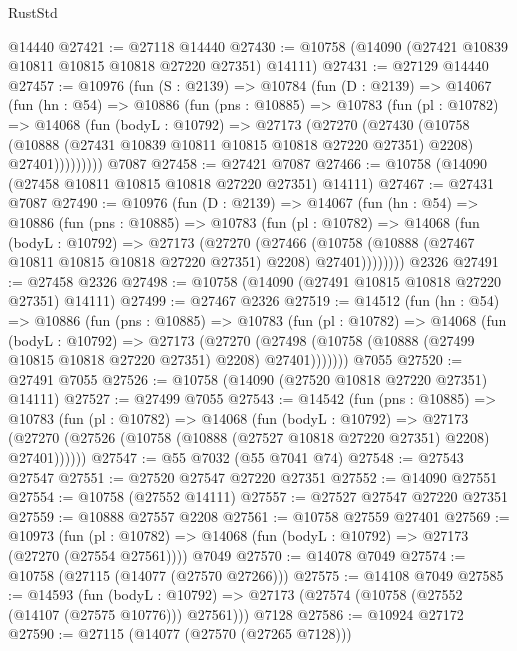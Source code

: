 \begin{lexlean}{RustStd}
\begin{coremodule}
    @14440
@27421 := @27118 @14440
@27430 := @10758 (@14090 (@27421 @10839 @10811 @10815 @10818 @27220 @27351) @14111)
@27431 := @27129 @14440
@27457 := @10976
    (fun (S : @2139) =>
    @10784
      (fun (D : @2139) =>
      @14067
        (fun (hn : @54) =>
        @10886
          (fun (pns : @10885) =>
          @10783
            (fun (pl : @10782) =>
            @14068
              (fun (bodyL : @10792) =>
              @27173
                (@27270
                  (@27430
                    (@10758
                      (@10888 (@27431 @10839 @10811 @10815 @10818 @27220 @27351) @2208)
                      @27401)))))))))
    @7087
@27458 := @27421 @7087
@27466 := @10758 (@14090 (@27458 @10811 @10815 @10818 @27220 @27351) @14111)
@27467 := @27431 @7087
@27490 := @10976
    (fun (D : @2139) =>
    @14067
      (fun (hn : @54) =>
      @10886
        (fun (pns : @10885) =>
        @10783
          (fun (pl : @10782) =>
          @14068
            (fun (bodyL : @10792) =>
            @27173
              (@27270
                (@27466
                  (@10758 (@10888 (@27467 @10811 @10815 @10818 @27220 @27351) @2208) @27401))))))))
    @2326
@27491 := @27458 @2326
@27498 := @10758 (@14090 (@27491 @10815 @10818 @27220 @27351) @14111)
@27499 := @27467 @2326
@27519 := @14512
    (fun (hn : @54) =>
    @10886
      (fun (pns : @10885) =>
      @10783
        (fun (pl : @10782) =>
        @14068
          (fun (bodyL : @10792) =>
          @27173
            (@27270
              (@27498 (@10758 (@10888 (@27499 @10815 @10818 @27220 @27351) @2208) @27401)))))))
    @7055
@27520 := @27491 @7055
@27526 := @10758 (@14090 (@27520 @10818 @27220 @27351) @14111)
@27527 := @27499 @7055
@27543 := @14542
    (fun (pns : @10885) =>
    @10783
      (fun (pl : @10782) =>
      @14068
        (fun (bodyL : @10792) =>
        @27173 (@27270 (@27526 (@10758 (@10888 (@27527 @10818 @27220 @27351) @2208) @27401))))))
@27547 := @55 @7032 (@55 @7041 @74)
@27548 := @27543 @27547
@27551 := @27520 @27547 @27220 @27351
@27552 := @14090 @27551
@27554 := @10758 (@27552 @14111)
@27557 := @27527 @27547 @27220 @27351
@27559 := @10888 @27557 @2208
@27561 := @10758 @27559 @27401
@27569 := @10973
    (fun (pl : @10782) => @14068 (fun (bodyL : @10792) => @27173 (@27270 (@27554 @27561))))
    @7049
@27570 := @14078 @7049
@27574 := @10758 (@27115 (@14077 (@27570 @27266)))
@27575 := @14108 @7049
@27585 := @14593
    (fun (bodyL : @10792) => @27173 (@27574 (@10758 (@27552 (@14107 (@27575 @10776))) @27561)))
    @7128
@27586 := @10924 @27172
@27590 := @27115 (@14077 (@27570 (@27265 @7128)))

\end{coremodule}
\end{lexlean}
